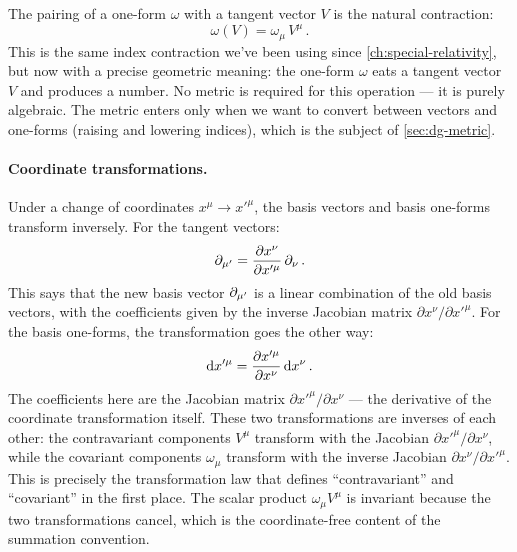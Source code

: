 The pairing of a one-form $\omega$ with a tangent vector $V$ is the natural
contraction:
%
\begin{equation}
  \omega(V) = \omega_\mu\, V^\mu \,.
  \label{eq:covector-pairing}
\end{equation}
%
This is the same index contraction we've been using since
\cref{ch:special-relativity}, but now with a precise geometric meaning: the
one-form $\omega$ eats a tangent vector $V$ and produces a number.  No metric
is required for this operation --- it is purely algebraic.  The metric enters
only when we want to convert between vectors and one-forms (raising and
lowering indices), which is the subject of \cref{sec:dg-metric}.

\paragraph{Coordinate transformations.}

Under a change of coordinates $x^\mu \to x'^\mu$, the basis vectors and basis
one-forms transform inversely.  For the tangent vectors:
%
\begin{equation}
  \partial_{\mu'} = \frac{\partial x^\nu}{\partial x'^\mu}\,\partial_{\nu} \,.
  \label{eq:basis-transform}
\end{equation}
%
This says that the new basis vector $\partial_{\mu'}$ is a linear combination of the
old basis vectors, with the coefficients given by the inverse Jacobian matrix
$\partial x^\nu / \partial x'^\mu$.  For the basis one-forms, the
transformation goes the other way:
%
\begin{equation}
  \mathrm{d} x'^\mu = \frac{\partial x'^\mu}{\partial x^\nu}\,\mathrm{d} x^\nu \,.
  \label{eq:cobasis-transform}
\end{equation}
%
The coefficients here are the Jacobian matrix $\partial x'^\mu / \partial
x^\nu$ --- the derivative of the coordinate transformation itself.  These two
transformations are inverses of each other: the contravariant components
$V^\mu$ transform with the Jacobian $\partial x'^\mu / \partial x^\nu$, while
the covariant components $\omega_\mu$ transform with the inverse Jacobian
$\partial x^\nu / \partial x'^\mu$.  This is precisely the transformation law
that defines ``contravariant'' and ``covariant'' in the first place.  The
scalar product $\omega_\mu V^\mu$ is invariant because the two
transformations cancel, which is the coordinate-free content of the summation
convention.

